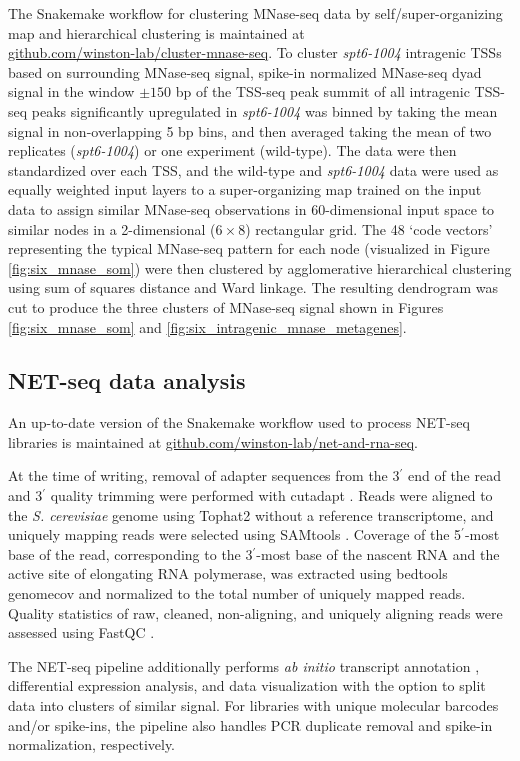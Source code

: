 The Snakemake \citep{koster2012} workflow for clustering MNase-seq data by self/super-organizing map and hierarchical clustering is maintained at\\\href{https://github.com/winston-lab/cluster-mnase-seq}{github.com/winston-lab/cluster-mnase-seq}.
To cluster \textit{spt6-1004} intragenic TSSs based on surrounding MNase-seq signal, spike-in normalized MNase-seq dyad signal in the window $\pm150$ bp of the TSS-seq peak summit of all intragenic TSS-seq peaks significantly upregulated in \textit{spt6-1004} was binned by taking the mean signal in non-overlapping 5 bp bins, and then averaged taking the mean of two replicates (\textit{spt6-1004}) or one experiment (wild-type).
The data were then standardized over each TSS, and the wild-type and \textit{spt6-1004} data were used as equally weighted input layers to a super-organizing map \citep{wehrens2007} trained on the input data to assign similar MNase-seq observations in 60-dimensional input space to similar nodes in a 2-dimensional ($6 \times 8$) rectangular grid.
The 48 `code vectors' representing the typical MNase-seq pattern for each node (visualized in Figure \ref{fig:six_mnase_som}) were then clustered by agglomerative hierarchical clustering using sum of squares distance and Ward linkage.
The resulting dendrogram was cut to produce the three clusters of MNase-seq signal shown in Figures \ref{fig:six_mnase_som} and \ref{fig:six_intragenic_mnase_metagenes}.

\subsection{NET-seq data analysis}

An up-to-date version of the Snakemake \citep{koster2012} workflow used to process NET-seq libraries is maintained at \href{https://github.com/winston-lab/net-and-rna-seq}{github.com/winston-lab/net-and-rna-seq}.

At the time of writing, removal of adapter sequences from the 3$^\prime$ end of the read and 3$^\prime$ quality trimming were performed with cutadapt \citep{martin2011}.
Reads were aligned to the \textit{S. cerevisiae} genome using Tophat2 \citep{kim2013} without a reference transcriptome, and uniquely mapping reads were selected using SAMtools \citep{li2009}.
Coverage of the 5$^\prime$-most base of the read, corresponding to the 3$^\prime$-most base of the nascent RNA and the active site of elongating RNA polymerase, was extracted using bedtools genomecov \citep{quinlan2010} and normalized to the total number of uniquely mapped reads.
Quality statistics of raw, cleaned, non-aligning, and uniquely aligning reads were assessed using FastQC \citep{andrews2010}.

The NET-seq pipeline additionally performs \textit{ab initio} transcript annotation \citep{pertea2015}, differential expression analysis, and data visualization with the option to split data into clusters of similar signal.
For libraries with unique molecular barcodes and/or spike-ins, the pipeline also handles PCR duplicate removal and spike-in normalization, respectively.

\clearpage

\begingroup
    \singlespacing
    
\endgroup
